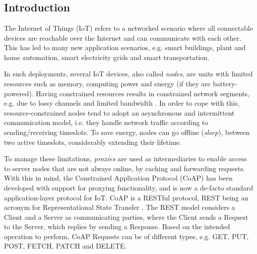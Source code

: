 \chapter[\paperIIItitle]{\texorpdfstring{%
                \paperIIItitle}{%
                \paperIIItitle}}

\label{ch:oscore}
\paperRemark{\paperIIIref}
{

\section{Introduction}
\label{s:introduction}

The Internet of Things (IoT) refers to a networked scenario where all connectable devices are reachable over the Internet and can communicate with each other. This has led to many new application scenarios, e.g. smart buildings, plant and home automation, smart electricity grids and smart transportation.

In such deployments, several IoT devices, also called \emph{nodes}, are units with limited resources such as memory, computing power and energy (if they are battery-powered). Having constrained resources results in constrained network segments, e.g. due to lossy channels and limited bandwidth \cite{rfc7228}. In order to cope with this, resource-constrained nodes tend to adopt an asynchronous and intermittent communication model, i.e. they handle network traffic according to sending/receiving timeslots. To save energy, nodes can go offline (\emph{sleep}), between two active timeslots, considerably extending their lifetime.

To manage these limitations, \emph{proxies} are used as intermediaries to enable access to server nodes that are not always online, by caching and forwarding requests.  With this in mind, the Constrained Application Protocol (CoAP) \cite{rfc7252} has been developed with support for proxying functionality, and is now a de-facto standard application-layer protocol for IoT. CoAP is a RESTful protocol, REST being an acronym for Representational State Transfer \cite{fielding2000architectural}. The REST model considers a Client and a Server as communicating parties, where the Client sends a Request to the Server, which replies by sending a Response. Based on the intended operation to perform, CoAP Requests can be of different types, e.g. GET, PUT, POST, FETCH, PATCH and DELETE.

}

